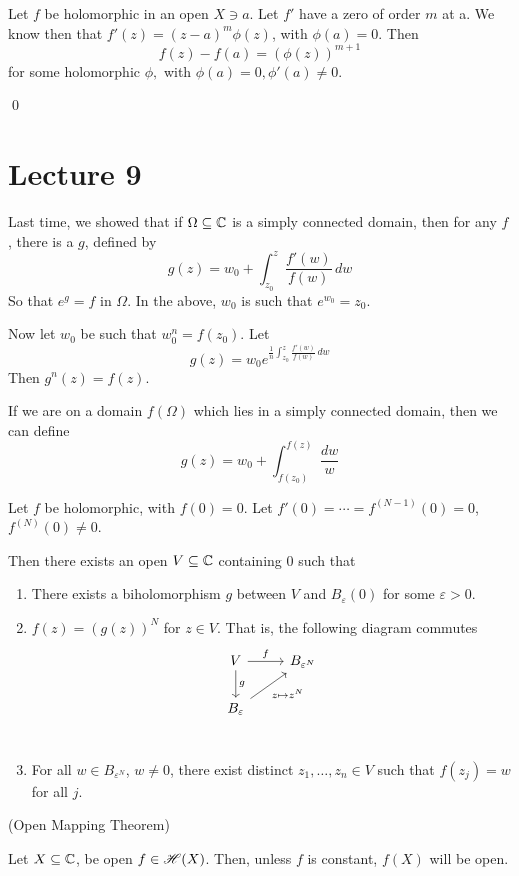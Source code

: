 \documentclass[x11names,reqno,14pt]{extarticle}
\begin{document}
\thm

Let $f$ be holomorphic in an open $X\ni a$. Let $f'$ have a zero of order $m$ at a. We know then that $f'(z) = (z - a)^m\phi(z)$, with $\phi(a) = 0$. Then
\[
f(z) - f(a) = (\phi(z))^{m + 1}
\]
for some holomorphic $\phi,$ with $\phi(a)= 0, \phi'(a)\neq0$. 

\proof

\qed

\section*{Lecture 9}

Last time, we showed that if $\Omega\subseteq \mathbb{C}$ is a simply connected domain, then for any $f$, there is a $g$, defined by
\[
g(z) = w_0 + \int_{z_0}^z\frac{f'(w)}{f(w)}\,dw
\]
So that $e^g = f$ in $\Omega$. In the above, $w_0$ is such that $e^{w_0} = z_0$. 

Now let $w_0$ be such that $w_0^n = f(z_0)$. Let 
\[
g(z) = w_0e^{\frac{1}{n}\int_{z_0}^z\frac{f'(w)}{f(w)}\,dw}
\]
Then $g^n(z) = f(z)$. 

If we are on a domain $f(\Omega)$ which lies in a simply connected domain, then we can define
\[
g(z) = w_0 + \int_{f(z_0)}^{f(z)}\frac{dw}{w}
\]

\thm

Let $f$ be holomorphic, with $f(0) = 0$. Let $f'(0) = \cdots = f^{(N - 1)}(0) = 0$, $f^{(N)}(0)\neq0$. 

Then there exists an open $V \subseteq \mathbb{C}$ containing $0$ such that 
\begin{enumerate}
\item There exists a biholomorphism $g$ between $V$ and $B_{\varepsilon}(0)$ for some $\varepsilon>0$. 
\item $f(z) = (g(z))^N$ for $z \in V$. That is, the following diagram commutes
\[
\begin{tikzcd}
V \ar[d, "g"] \ar[r, "f"] & B_{\varepsilon^N} \\
B_{\varepsilon}\ar[ur, "z\mapsto z^N"'] & \\
\end{tikzcd}
\]
\item For all $w \in B_{\varepsilon^N}$, $w\neq0$, there exist distinct $z_1, \dots, z_n \in V$ such that $f(z_j) = w$ for all $j$. 

\end{enumerate}

\cor (Open Mapping Theorem)

Let $X \subseteq \mathbb{C}$, be open $f \in \mathscr{H}(X)$. Then, unless $f$ is constant, $f(X)$ will be open. 
\end{document}
